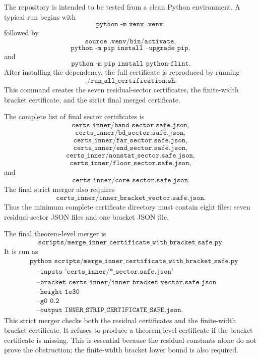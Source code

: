 \documentclass[11pt]{article}
\newcommand{\code}[1]{\texttt{#1}}
\begin{document}
The repository is intended to be tested from a clean Python environment.  A
typical run begins with
\[
        \code{python -m venv .venv},
\]
followed by
\[
        \code{source .venv/bin/activate},
\]
\[
        \code{python -m pip install --upgrade pip},
\]
and
\[
        \code{python -m pip install python-flint}.
\]
After installing the dependency, the full certificate is reproduced by running
\[
        \code{./run\_all\_certification.sh}.
\]
This command creates the seven residual-sector certificates, the finite-width
bracket certificate, and the strict final merged certificate.

The complete list of final sector certificates is
\[
        \code{certs\_inner/band\_sector.safe.json},
\]
\[
        \code{certs\_inner/bd\_sector.safe.json},
\]
\[
        \code{certs\_inner/far\_sector.safe.json},
\]
\[
        \code{certs\_inner/end\_sector.safe.json},
\]
\[
        \code{certs\_inner/nonstat\_sector.safe.json},
\]
\[
        \code{certs\_inner/floor\_sector.safe.json},
\]
and
\[
        \code{certs\_inner/core\_sector.safe.json}.
\]
The final strict merger also requires
\[
        \code{certs\_inner/inner\_bracket\_vector.safe.json}.
\]
Thus the minimum complete certificate directory must contain eight files:
seven residual-sector JSON files and one bracket JSON file.

The final theorem-level merger is
\[
        \code{scripts/merge\_inner\_certificate\_with\_bracket\_safe.py}.
\]
It is run as
\[
\begin{aligned}
        &\code{python scripts/merge\_inner\_certificate\_with\_bracket\_safe.py} \\
        &\quad
        \code{--inputs 'certs\_inner/*\_sector.safe.json'} \\
        &\quad
        \code{--bracket certs\_inner/inner\_bracket\_vector.safe.json} \\
        &\quad
        \code{--height 1e30} \\
        &\quad
        \code{--g0 0.2} \\
        &\quad
        \code{--output INNER\_STRIP\_CERTIFICATE\_SAFE.json}.
\end{aligned}
\]
This strict merger checks both the residual certificates and the finite-width
bracket certificate.  It refuses to produce a theorem-level certificate if the
bracket certificate is missing.  This is essential because the residual
constants alone do not prove the obstruction; the finite-width bracket lower
bound is also required.
\end{document}
